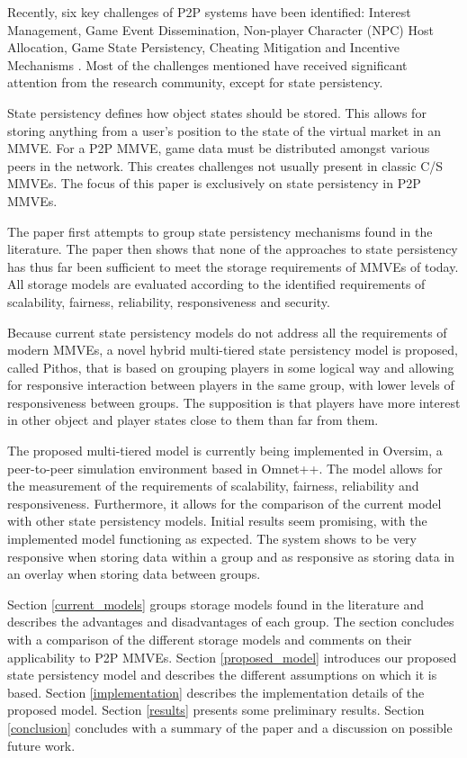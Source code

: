 \documentclass[10pt,a4paper,conference]{IEEEtran}
\begin{document}
Recently, six key challenges of P2P systems have been identified: Interest Management, Game Event Dissemination, Non-player Character (NPC) Host
Allocation, Game State Persistency, Cheating Mitigation and Incentive Mechanisms \cite{Fan_deisgn_issues_p2p}. Most of the challenges mentioned have
received significant attention from the research community, except for state persistency.

State persistency defines how object states should be stored. This allows for storing anything from a user's position to the state of the virtual
market in an MMVE. For a P2P MMVE, game data must be distributed amongst various peers in the network. This creates challenges not usually present in
classic C/S MMVEs. The focus of this paper is exclusively on state persistency in P2P MMVEs.

The paper first attempts to group state persistency mechanisms found in the literature. The paper then shows that none of the approaches to state
persistency has thus far been sufficient to meet the storage requirements of MMVEs of today. All storage models are evaluated according to the
identified requirements of scalability, fairness, reliability, responsiveness and security.

Because current state persistency models do not address all the requirements of modern MMVEs, a novel hybrid multi-tiered state persistency model is
proposed, called Pithos, that is based on grouping players in some logical way and allowing for responsive interaction between players in the same
group, with lower levels of responsiveness between groups. The supposition is that players have more interest in other object and player states close
to them than far from them.

The proposed multi-tiered model is currently being implemented in Oversim, a peer-to-peer simulation environment based in Omnet++. The model allows
for the measurement of the requirements of scalability, fairness, reliability and responsiveness. Furthermore, it allows for the comparison of the
current model with other state persistency models. Initial results seem promising, with the implemented model functioning as expected. The system
shows to be very responsive when storing data within a group and as responsive as storing data in an overlay when storing data between groups.

Section \ref{current_models} groups storage models found in the literature and describes the advantages and disadvantages of each group. The section
concludes with a comparison of the different storage models and comments on their applicability to P2P MMVEs.
%
Section \ref{proposed_model} introduces our proposed state persistency model and describes the different assumptions on which it is based.
%
Section \ref{implementation} describes the implementation details of the proposed model.
%
Section \ref{results} presents some preliminary results.
%
Section \ref{conclusion} concludes with a summary of the paper and a discussion on possible future work.
\end{document}
